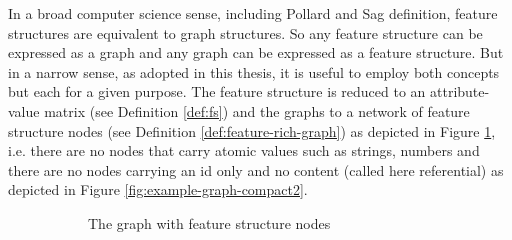     In a broad computer science sense, including Pollard and Sag definition, feature structures are equivalent to graph structures. So any feature structure can be expressed as a graph and any graph can be expressed as a feature structure. But in a narrow sense, as adopted in this thesis, it is useful to employ both concepts but each for a given purpose. The feature structure is reduced to an attribute-value matrix (see Definition \ref{def:fs}) and the graphs to a network of feature structure nodes (see Definition \ref{def:feature-rich-graph}) as depicted in Figure \ref{fig:example-graph-compact1}, i.e. there are no nodes that carry atomic values such as strings, numbers and there are no nodes carrying an id only and no content (called here referential) as depicted in Figure \ref{fig:example-graph-compact2}.

    \begin{figure}[!ht]
        \centering
        \begin{subfigure}[b]{0.45\textwidth}
            \centering
            \caption{The graph with feature structure nodes}
            \label{fig:example-graph-compact1}
        \end{subfigure}%
        \quad\quad
        \begin{subfigure}[b]{0.45\textwidth}
            \centering
\end{subfigure}
\end{figure}
